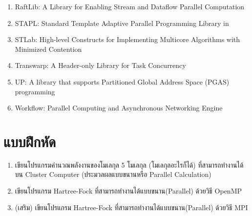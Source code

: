 \begin{enumerate}[topsep=0pt,noitemsep]
  \item RaftLib: A \cpp Library for Enabling Stream and Dataflow Parallel Computation

  \item STAPL: Standard Template Adaptive Parallel Programming Library in \cpp

  \item STLab: High-level Constructs for Implementing Multicore Algorithms with Minimized Contention

  \item Transwarp: A Header-only \cpp Library for Task Concurrency

  \item UP\cpp: A \cpp library that supports Partitioned Global Address Space (PGAS) programming

  \item Workflow: \cpp Parallel Computing and Asynchronous Networking Engine
\end{enumerate}


\section{แบบฝึกหัด}

\begin{enumerate}[topsep=0pt,noitemsep]
  \setlength\itemsep{1em}
  \item เขียนโปรแกรมคำนวณพลังงานของโมเลกุล 5 โมเลกุล (โมเลกุลอะไรก็ได้) ที่สามารถทำงานได้บน Cluster Computer
        (ประมวลผลแบบขนานหรือ Parallel Calculation)

  \item เขียนโปรแกรม Hartree-Fock ที่สามารถทำงานได้แบบขนาน(Parallel) ด้วยวิธี OpenMP

  \item (เสริม) เขียนโปรแกรม Hartree-Fock ที่สามารถทำงานได้แบบขนาน(Parallel) ด้วยวิธี MPI
\end{enumerate}